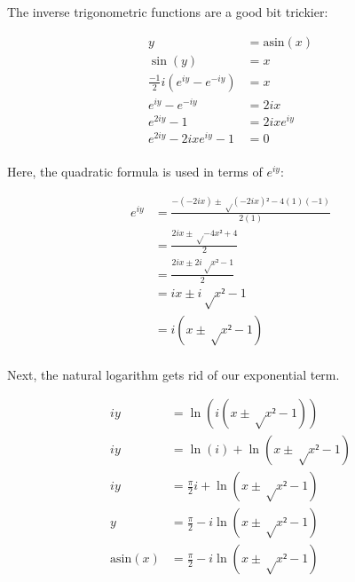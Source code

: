 \documentclass[10pt]{article}
\begin{document}
\begin{multicols}{2}
The inverse trigonometric functions are a good bit trickier:

\begin{align*}
    y &= \mathrm{asin}(x) \\
    \sin(y) &= x \\
    \frac{-1}{2}i (e^{iy} - e^{-iy}) &= x \\
    e^{iy} - e^{-iy} &= 2ix \\
    e^{2iy} - 1 &= 2ix e^{iy} \\
    e^{2iy} - 2ix e^{iy} - 1 &= 0 \\
\end{align*}

Here, the quadratic formula is used in terms of $e^{iy}$:

\begin{align*}
    e^{iy} &= \frac{ -(-2ix) ± √{(-2ix)² - 4(1)(-1)} }{2(1)} \\
    &= \frac{ 2ix ± √{-4x² + 4} }{2} \\
    &= \frac{ 2ix ± 2i √{x² - 1}}{2} \\
    &= ix ± i √{x² - 1} \\
    &= i(x ± √{x² - 1}) \\
\end{align*}

Next, the natural logarithm gets rid of our exponential term.

\begin{align*}
    iy &= \ln(i (x ± √{x² - 1})) \\
    iy &= \ln(i) + \ln(x ± √{x² - 1}) \\
    iy &= \frac{π}{2}i + \ln(x ± √{x² - 1}) \\
    y &= \frac{π}{2} - i \ln(x ± √{x² - 1}) \\
    \mathrm{asin}(x) &= \frac{π}{2} - i \ln(x ± √{x² - 1})
\end{align*}

\end{multicols}
\end{document}
